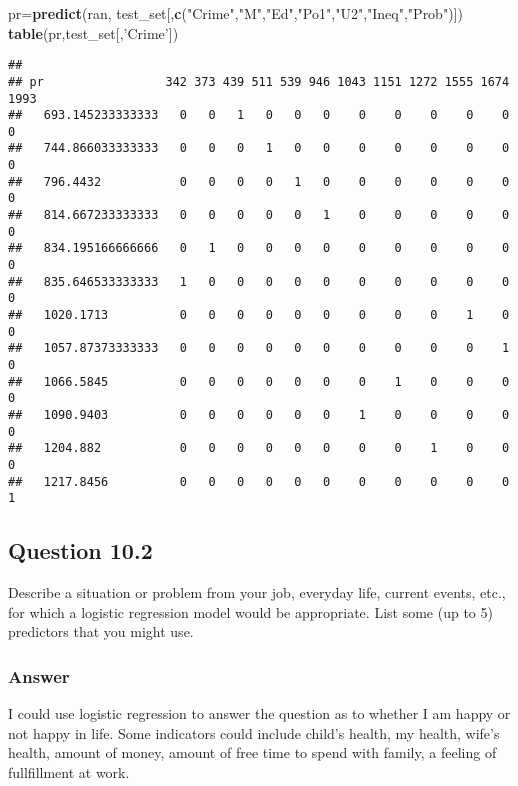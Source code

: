 \documentclass[]{article}
\newenvironment{Shaded}{\begin{snugshade}}{\end{snugshade}}
\newcommand{\KeywordTok}[1]{\textcolor[rgb]{0.13,0.29,0.53}{\textbf{#1}}}
\newcommand{\NormalTok}[1]{#1}
\newcommand{\StringTok}[1]{\textcolor[rgb]{0.31,0.60,0.02}{#1}}
\begin{document}
\begin{Shaded}
\begin{Highlighting}[]
\NormalTok{pr=}\KeywordTok{predict}\NormalTok{(ran, test_set[,}\KeywordTok{c}\NormalTok{(}\StringTok{"Crime"}\NormalTok{,}\StringTok{"M"}\NormalTok{,}\StringTok{"Ed"}\NormalTok{,}\StringTok{"Po1"}\NormalTok{,}\StringTok{"U2"}\NormalTok{,}\StringTok{"Ineq"}\NormalTok{,}\StringTok{"Prob"}\NormalTok{)])}
\KeywordTok{table}\NormalTok{(pr,test_set[,}\StringTok{'Crime'}\NormalTok{])}
\end{Highlighting}
\end{Shaded}

\begin{verbatim}
##                   
## pr                 342 373 439 511 539 946 1043 1151 1272 1555 1674 1993
##   693.145233333333   0   0   1   0   0   0    0    0    0    0    0    0
##   744.866033333333   0   0   0   1   0   0    0    0    0    0    0    0
##   796.4432           0   0   0   0   1   0    0    0    0    0    0    0
##   814.667233333333   0   0   0   0   0   1    0    0    0    0    0    0
##   834.195166666666   0   1   0   0   0   0    0    0    0    0    0    0
##   835.646533333333   1   0   0   0   0   0    0    0    0    0    0    0
##   1020.1713          0   0   0   0   0   0    0    0    0    1    0    0
##   1057.87373333333   0   0   0   0   0   0    0    0    0    0    1    0
##   1066.5845          0   0   0   0   0   0    0    1    0    0    0    0
##   1090.9403          0   0   0   0   0   0    1    0    0    0    0    0
##   1204.882           0   0   0   0   0   0    0    0    1    0    0    0
##   1217.8456          0   0   0   0   0   0    0    0    0    0    0    1
\end{verbatim}

\hypertarget{question-10.2}{%
\subsection{Question 10.2}\label{question-10.2}}

Describe a situation or problem from your job, everyday life, current
events, etc., for which a logistic regression model would be
appropriate. List some (up to 5) predictors that you might use.

\hypertarget{answer}{%
\subsubsection{Answer}\label{answer}}

I could use logistic regression to answer the question as to whether I
am happy or not happy in life. Some indicators could include child's
health, my health, wife's health, amount of money, amount of free time
to spend with family, a feeling of fullfillment at work.
\end{document}
